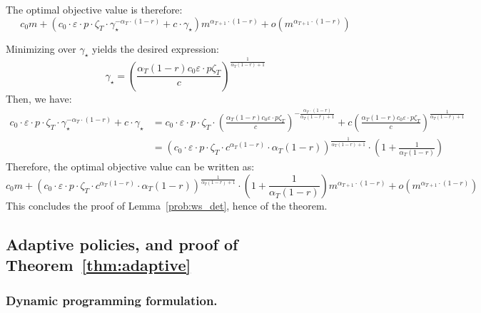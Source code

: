 \documentclass[blindrev]{informs3noheader}
\begin{document}
The optimal objective value is therefore:
$$c_0m+\left(c_0\cdot\varepsilon\cdot p\cdot\zeta_T\cdot \gamma_\star^{-\alpha_T\cdot(1-r)}+c\cdot\gamma_\star\right)m^{\alpha_{T+1}\cdot(1-r)}+ o\left(m^{\alpha_{T+1}\cdot(1-r)}\right)$$

Minimizing over $\gamma_\star$ yields the desired expression:
$$\gamma_\star=\left(\frac{\alpha_T(1-r)c_0\varepsilon\cdot p \zeta_T}{c}\right)^{\frac{1}{\alpha_T(1-r)+1}}$$
Then, we have:
\begin{align*}
c_0\cdot\varepsilon\cdot p\cdot\zeta_T\cdot \gamma_\star^{-\alpha_T\cdot(1-r)}+c\cdot\gamma_\star
&= c_0\cdot\varepsilon\cdot p\cdot\zeta_T\cdot \left(\frac{\alpha_T(1-r)c_0\varepsilon\cdot p \zeta_T}{c}\right)^{-\frac{\alpha_T\cdot(1-r)}{\alpha_T(1-r)+1}}+c\left(\frac{\alpha_T(1-r)c_0\varepsilon\cdot p \zeta_T}{c}\right)^{\frac{1}{\alpha_T(1-r)+1}}\\
&= \left(c_0\cdot\varepsilon\cdot p\cdot\zeta_T\cdot c^{\alpha_T(1-r)}\cdot\alpha_T(1-r)\right)^{\frac{1}{\alpha_T(1-r)+1}}\cdot \left(1+\frac{1}{\alpha_T(1-r)}\right)
\end{align*}
Therefore, the optimal objective value can be written as:
$$c_0m+\left(c_0\cdot\varepsilon\cdot p\cdot\zeta_T\cdot c^{\alpha_T(1-r)}\cdot\alpha_T(1-r)\right)^{\frac{1}{\alpha_T(1-r)+1}}\cdot \left(1+\frac{1}{\alpha_T(1-r)}\right)m^{\alpha_{T+1}\cdot(1-r)}+ o\left(m^{\alpha_{T+1}\cdot(1-r)}\right)$$
This concludes the proof of Lemma~\ref{prob:ws_det}, hence of the theorem.
\hfill\Halmos

\subsection{Adaptive policies, and proof of Theorem~\ref{thm:adaptive}}
\label{app:adaptive}

\subsubsection*{Dynamic programming formulation.}
\end{document}
